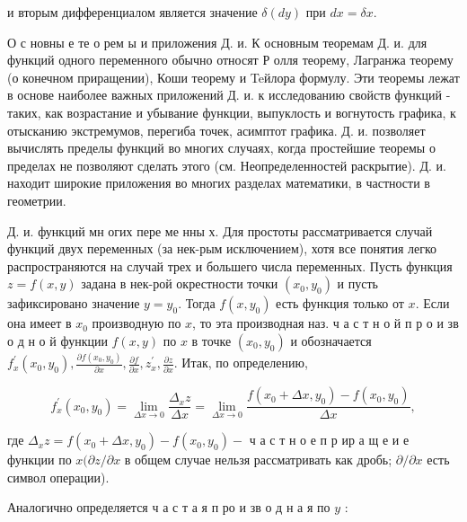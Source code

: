 \documentclass[10pt]{article}
\begin{document}
и вторым дифференциалом является значение $\delta(d y)$ при $d x=\delta x$.



О с новны е те о рем ы и приложения Д. и. К основным теоремам Д. и. для функций одного переменного обычно относят Р олля теорему, Лагранжа теорему (о конечном приращении), Коши теорему и Teйлора формулу. Эти теоремы лежат в основе наиболее важных приложений Д. и. к исследованию свойств функций - таких, как возрастание и убывание функции, выпуклость и вогнутость графика, к отысканию экстремумов, перегиба точек, асимптот графика. Д. и. позволяет вычислять пределы функций во многих случаях, когда простейшие теоремы $о$ пределах не позволяют сделать этого (см. Неопределенностей раскрытие). Д. и. находит широкие приложения во многих разделах математики, в частности в геометрии.



Д. и. функций мн огих пере ме нны х. Для простоты рассматривается случай функций двух переменных (за нек-рым исключением), хотя все понятия легко распространяются на случай трех и большего числа переменных. Пусть функция $z=f(x, y)$ задана в нек-рой окрестности точки $\left(x_{0}, y_{0}\right)$ и пусть зафиксировано значение $y=y_{0}$. Тогда $f\left(x, y_{0}\right)$ есть функция только от $x$. Если она имеет в $x_{0}$ производную по $x$, то эта производная наз. ч а с т н о й п р о и зв о д н о й функции $f(x, y)$ по $x$ в точке $\left(x_{0}, y_{0}\right)$ и обозначается $f_{x}^{\prime}\left(x_{0}, y_{0}\right), \frac{\partial f\left(x_{0}, y_{0}\right)}{\partial x}, \frac{\partial f}{\partial x}, z_{x}^{\prime}, \frac{\partial z}{\partial x}$. Итак, по определению,



\[

f_{x}^{\prime}\left(x_{0}, y_{0}\right)=\lim _{\Delta x \rightarrow 0} \frac{\Delta_{x} z}{\Delta x}=\lim _{\Delta x \rightarrow 0} \frac{f\left(x_{0}+\Delta x, y_{0}\right)-f\left(x_{0}, y_{0}\right)}{\Delta x},

\]



где $\Delta_{x} z=f\left(x_{0}+\Delta x, y_{0}\right)-f\left(x_{0}, y_{0}\right)-$ ч а с т н о е п р ир а щ е и е функции по $x(\partial z / \partial x$ в общем случае нельзя рассматривать как дробь; $\partial / \partial x$ есть символ операции).



Аналогично определяется ч а с т а я п ро и зв о д н а я по $y$ :
\end{document}
